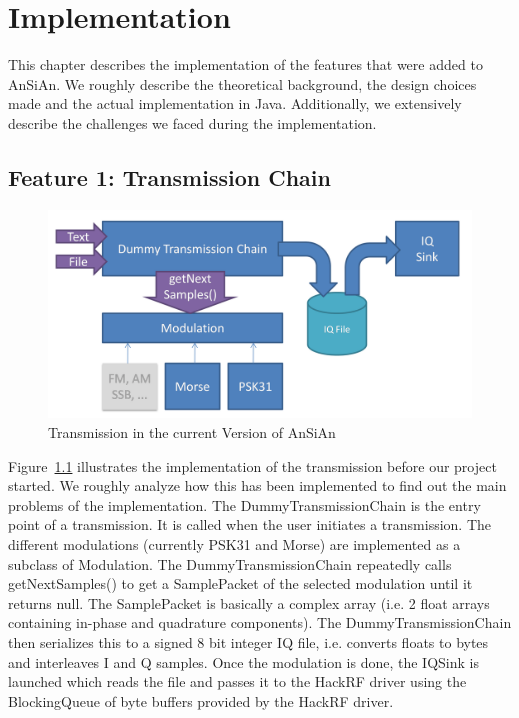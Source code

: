 
\chapter{Implementation}

This chapter describes the implementation of the features that were added to \ac{AnSiAn}. We roughly describe the theoretical background, the design choices made and the actual implementation in Java. Additionally, we extensively describe the challenges we faced during the implementation. 

\section{Feature 1: Transmission Chain}

\label{sec:impl:feature1}

\begin{figure}[!htbp]
	\centering
	\includegraphics[width=1\linewidth]{gfx/TX_chain_step2.png}
	\caption{Transmission in the current Version of AnSiAn \cite{Mantz2016}}
	\label{fig:tx_chain_old2}
\end{figure}


Figure~\ref{fig:tx_chain_old2} illustrates the implementation of the transmission before our project started. We roughly analyze how this has been implemented to find out the main problems of the implementation. The DummyTransmissionChain is the entry point of a transmission. It is called when the user initiates a transmission. The different modulations (currently PSK31 and Morse) are implemented as a subclass of Modulation. The DummyTransmissionChain repeatedly calls getNextSamples() to get a SamplePacket of the selected modulation until it returns null. The SamplePacket is basically a complex array (i.e. 2 float arrays containing in-phase and quadrature components). The DummyTransmissionChain then serializes this to a signed 8 bit integer IQ file, i.e. converts floats to bytes and interleaves I and Q samples. Once the modulation is done, the IQSink is launched which reads the file and passes it to the HackRF driver using the BlockingQueue of byte buffers provided by the HackRF driver. 

